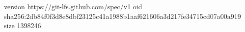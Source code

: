 version https://git-lfs.github.com/spec/v1
oid sha256:2db84f0f3d8e8dbf23125c41a1988b1aaf621606a3d217fe34715cd07a00a919
size 1398246
